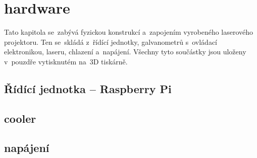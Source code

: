 \chapter{hardware}
Tato kapitola se~zabývá fyzickou konstrukcí a~zapojením vyrobeného laserového projektoru. Ten se~skládá z~řídící jednotky, galvanometrů s~ovládací elektronikou, laseru, chlazení a~napájení. Všechny tyto součástky jsou uloženy v~pouzdře vytisknutém na~3D tiskárně.

\section{Řídící jednotka -- Raspberry Pi}














\section{cooler}

\section{napájení}
